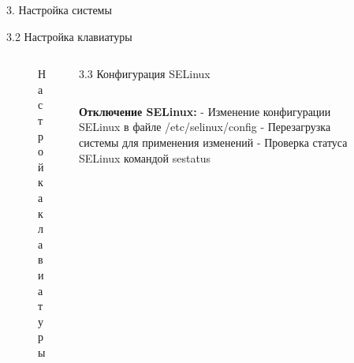 \documentclass[
  ignorenonframetext,
  aspectratio=169,
  russian,
]{beamer}
\begin{document}
\begin{frame}[fragile]{3. Настройка системы}
\begin{block}{3.2 Настройка клавиатуры}
\begin{columns}[c]
\begin{column}{0.3\linewidth}
\begin{figure}


\caption{\label{fig-keyboard}Настройка клавиатуры}

\end{figure}%
\end{column}

\begin{block}{3.3 Конфигурация SELinux}
\label{ux43aux43eux43dux444ux438ux433ux443ux440ux430ux446ux438ux44f-selinux}
\begin{columns}[c]
\begin{column}{0.7\linewidth}
\textbf{Отключение SELinux:} - Изменение конфигурации SELinux в файле
/etc/selinux/config - Перезагрузка системы для применения изменений -
Проверка статуса SELinux командой sestatus
\end{column}

\begin{column}{0.3\linewidth}
\begin{figure}

\end{figure}
\end{column}
\end{columns}
\end{block}
\end{columns}
\end{block}
\end{frame}
\end{document}
